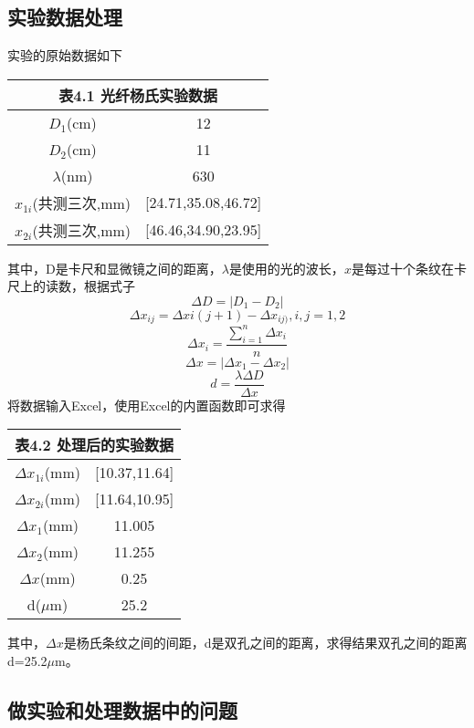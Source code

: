 \documentclass{zjureport}
\begin{document}
  \subsection{实验数据处理}
  \begin{clause}
  	\item 实验的原始数据如下
  	\begin{center}
  		\begin{tabular}{|c|c|}
  			\multicolumn{2}{c}{表4.1 光纤杨氏实验数据}\\
  			\hline
  			$D_{1}$(cm)&12\\\hline
  			$D_{2}$(cm)&11\\\hline
  			$\lambda$(nm)&630\\\hline
  			$x_{1i}$(共测三次,mm)&[24.71,35.08,46.72]\\\hline
  			$x_{2i}$(共测三次,mm)&[46.46,34.90,23.95]\\\hline
  		\end{tabular}
  	\end{center}
  其中，D是卡尺和显微镜之间的距离，$\lambda$是使用的光的波长，$x$是每过十个条纹在卡尺上的读数，根据式子
  $$\Delta D=|D_{1}-D_{2}|$$
  $$\Delta x_{ij}=\Delta x{i(j+1)}-\Delta x_{ij)},i,j=1,2$$
  $$\Delta x_{i}=\frac{\sum_{i=1}^{n}\Delta x_{i}}{n}$$
  $$\Delta x=|\Delta x_{1}-\Delta x_{2}|$$
  $$d=\frac{\lambda \Delta D}{\Delta x}$$
  将数据输入Excel，使用Excel的内置函数即可求得
  \begin{center}
  	\begin{tabular}{|c|c|}
  		\multicolumn{2}{c}{表4.2 处理后的实验数据}\\
  		\hline
  		$\Delta x_{1i}$(mm)&[10.37,11.64]\\\hline
  		$\Delta x_{2i}$(mm)&[11.64,10.95]\\\hline
  		$\Delta x_{1}$(mm)&11.005\\\hline
  		$\Delta x_{2}$(mm)&11.255\\\hline
  		$\Delta x$(mm)&0.25\\\hline
  		d($\mu$m)&25.2\\\hline
  	\end{tabular}
  \end{center}
  \end{clause}
其中，$\Delta x$是杨氏条纹之间的间距，d是双孔之间的距离，求得结果双孔之间的距离d=25.2$\mu $m。
     
  \subsection{做实验和处理数据中的问题}
    	~\\
    ~\\
    ~\\
    ~\\
    ~\\
    ~\\
    ~\\
    ~\\
    ~\\
    ~\\
    ~\\
    ~\\
    ~\\
    ~\\
    ~\\
\end{document}

